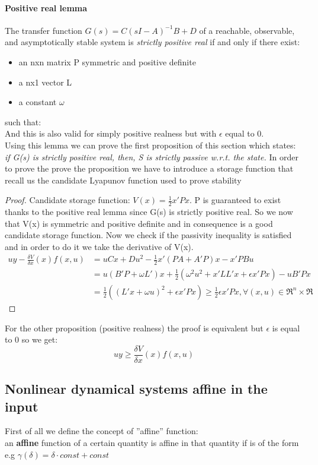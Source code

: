 \paragraph{Positive real lemma}
The transfer function $G(s)=C(sI-A)^{-1}B+D$ of a reachable, observable, and asymptotically stable system is \emph{strictly positive real} if and only if there exist:
\begin{itemize}
	\item an nxn matrix P symmetric and positive definite
	\item a nx1 vector L
	\item a constant $\omega$
\end{itemize}
such that: \qquad
{}
\\
And this is also valid for simply positive realness but with $\epsilon$ equal to 0.
\\
Using this lemma we can prove the first proposition of this section which states: \emph{if G(s) is strictly positive real, then, S is strictly passive w.r.t. the state.} In order to prove the prove the proposition we have to introduce a storage function that recall us the candidate Lyapunov function used to prove stability
\begin{proof}
	Candidate storage function: $V(x)=\frac{1}{2}x'Px$. P is guaranteed to exist thanks to the positive real lemma since G(s) is strictly positive real. So we now that V(x) is symmetric and positive definite and in consequence is a good candidate storage function.
	Now we check if the passivity inequality is satisfied and in order to do it we take the derivative of V(x).
\[
	\begin{aligned}
		uy-\frac{\delta V}{\delta x}(x)f(x,u)&=uCx+Du^2-\frac{1}{2}x'(PA+A'P)x-x'PBu\\
		&=u(B'P+\omega L')x+\frac{1}{2}(\omega^2u^2+x'LL'x+\epsilon x'Px)-uB'Px\\
		&=\frac{1}{2}\left( (L'x+\omega u)^2+\epsilon x'Px\right) \ge \frac{1}{2}\epsilon x'Px, \forall(x,u)\in \Re^n \times \Re
	\end{aligned}
\]
\end{proof}
For the other proposition (positive realness) the proof is equivalent but $\epsilon$ is equal to 0 so we get: \[uy\ge \frac{\delta V}{\delta x}(x)f(x,u)\]
\subsection{Nonlinear dynamical systems affine in the input} 
First of all we define the concept of ''affine'' function: \\ an \textbf{affine} function of a certain quantity is affine in that quantity if is of the form e.g $\gamma(\delta)=\delta\cdot const+const$


